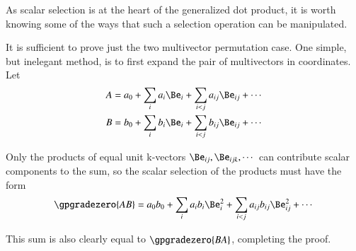 %
%
As scalar selection is at the heart of the
generalized dot product, it is worth knowing
some of the ways that such a selection operation can be manipulated.


It is sufficient to prove just the two multivector permutation case.
One simple, but inelegant method, is to first expand the pair of multivectors in coordinates.
Let
\begin{equation}\label{eqn:scalarSelectionPermutation:40}
\begin{aligned}
A &= a_0 + \sum_i a_i \Be_i + \sum_{i < j} a_{ij} \Be_{ij} + \cdots \\
B &= b_0 + \sum_i b_i \Be_i + \sum_{i < j} b_{ij} \Be_{ij} + \cdots
\end{aligned}
\end{equation}

Only the products of equal unit k-vectors \( \Be_{ij}, \Be_{ijk}, \cdots \)  can contribute scalar components to the sum, so the scalar selection of the products must have the form
\begin{dmath}\label{eqn:scalarSelectionPermutation:60}
\gpgradezero{ A B }
=
a_0 b_0 + \sum_i a_i b_i \Be_i^2 + \sum_{i < j} a_{ij} b_{ij} \Be_{ij}^2 + \cdots
\end{dmath}

This sum is also clearly equal to \( \gpgradezero{ B A } \), completing the proof.
